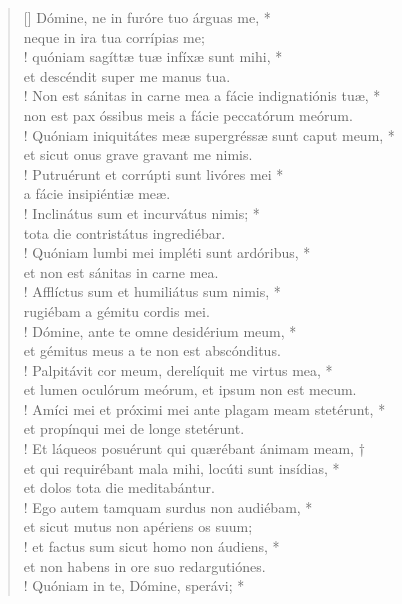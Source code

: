 \begin{verse}[\versewidth]
Dómine, ne in furóre tuo árguas me, *\\
neque in ira tua corrípias me;\\!
\vin quóniam sagíttæ tuæ infíxæ sunt mihi, *\\
\vin et descéndit super me manus tua.\\!
Non est sánitas in carne mea a fácie indignatiónis tuæ, *\\
non est pax óssibus meis a fácie peccatórum meórum.\\!
\vin Quóniam iniquitátes meæ supergréssæ sunt caput meum, *\\
\vin et sicut onus grave gravant me nimis.\\!
Putruérunt et corrúpti sunt livóres mei *\\
a fácie insipiéntiæ meæ.\\!
\vin Inclinátus sum et incurvátus nimis; *\\
\vin tota die contristátus ingrediébar.\\!
Quóniam lumbi mei impléti sunt ardóribus, *\\
et non est sánitas in carne mea.\\!
\vin Afflíctus sum et humiliátus sum nimis, *\\
\vin rugiébam a gémitu cordis mei.\\!
Dómine, ante te omne desidérium meum, *\\
et gémitus meus a te non est abscónditus.\\!
\vin Palpitávit cor meum, derelíquit me virtus mea, *\\
\vin et lumen oculórum meórum, et ipsum non est mecum.\\!
Amíci mei et próximi mei ante plagam meam stetérunt, *\\
et propínqui mei de longe stetérunt.\\!
\vin Et láqueos posuérunt qui quærébant ánimam meam, †\\
\vin et qui requirébant mala mihi, locúti sunt insídias, *\\
\vin et dolos tota die meditabántur.\\!
Ego autem tamquam surdus non audiébam, *\\
et sicut mutus non apériens os suum;\\!
\vin et factus sum sicut homo non áudiens, *\\
\vin et non habens in ore suo redargutiónes.\\!
Quóniam in te, Dómine, sperávi; *\\

\end{verse}
